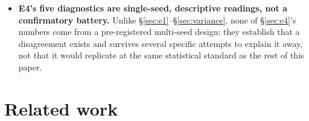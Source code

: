 \documentclass[11pt]{article}
\begin{document}
\begin{itemize}
  (rather than soft-loss) $L_0$ cap would answer the original question more
  cleanly still, at the cost of turning JumpReLU into another top-$k$
  variant and defeating the point of testing it; not attempted here.
\item \textbf{E4's five diagnostics are single-seed, descriptive readings,
  not a confirmatory battery.} Unlike \S\ref{sec:e1}--\S\ref{sec:variance},
  none of \S\ref{sec:e4}'s numbers come from a pre-registered
  multi-seed design; they establish that a disagreement exists and survives
  several specific attempts to explain it away, not that it would replicate
  at the same statistical standard as the rest of this paper.
\end{itemize}

\section{Related work}
\label{sec:related}
\end{document}
